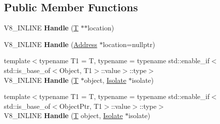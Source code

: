 \subsection*{Public Member Functions}
\begin{DoxyCompactItemize}
\item 
\mbox{\label{classv8_1_1internal_1_1Handle_af02dd0e938fb456009350e5c4db339c1}} 
V8\+\_\+\+I\+N\+L\+I\+NE {\bfseries Handle} (\mbox{\hyperlink{classv8_1_1internal_1_1torque_1_1T}{T}} $\ast$$\ast$location)
\item 
\mbox{\label{classv8_1_1internal_1_1Handle_aa72cc18bb37e4b4a2108416f2407d272}} 
V8\+\_\+\+I\+N\+L\+I\+NE {\bfseries Handle} (\mbox{\hyperlink{classuintptr__t}{Address}} $\ast$location=nullptr)
\item 
\mbox{\label{classv8_1_1internal_1_1Handle_aa490d9f58a51cfde00ba3eccb2084ac4}} 
{\footnotesize template$<$typename T1  = T, typename  = typename std\+::enable\+\_\+if$<$                                 std\+::is\+\_\+base\+\_\+of$<$\+Object, T1$>$\+::value$>$\+::type$>$ }\\V8\+\_\+\+I\+N\+L\+I\+NE {\bfseries Handle} (\mbox{\hyperlink{classv8_1_1internal_1_1torque_1_1T}{T}} $\ast$object, \mbox{\hyperlink{classv8_1_1internal_1_1Isolate}{Isolate}} $\ast$isolate)
\item 
\mbox{\label{classv8_1_1internal_1_1Handle_aaaa97b75a603435d51976aad66c38a12}} 
{\footnotesize template$<$typename T1  = T, typename  = typename std\+::enable\+\_\+if$<$                                 std\+::is\+\_\+base\+\_\+of$<$\+Object\+Ptr, T1$>$\+::value$>$\+::type$>$ }\\V8\+\_\+\+I\+N\+L\+I\+NE {\bfseries Handle} (\mbox{\hyperlink{classv8_1_1internal_1_1torque_1_1T}{T}} object, \mbox{\hyperlink{classv8_1_1internal_1_1Isolate}{Isolate}} $\ast$isolate)
\item 
\mbox{\label{classv8_1_1internal_1_1Handle_ac54502311b10ce3e05401f0c15b2b064}} 
$$
\end{DoxyCompactItemize}
